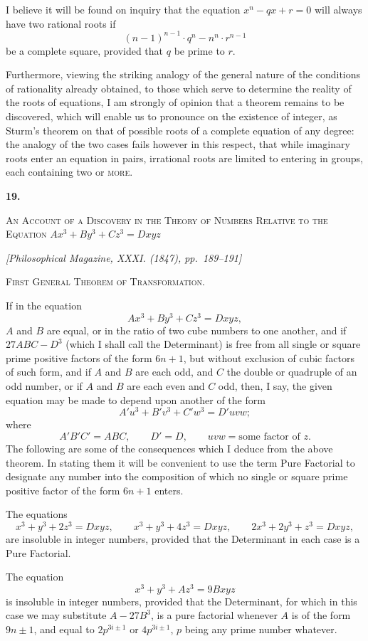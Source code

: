 \documentclass[11pt]{article}
\newcommand{\paperhead}[3]{%
  \clearpage
  \begin{center}
  {\Large\bfseries #1.}\par\vspace{0.85em}
  {\large\scshape #2}\par\vspace{0.6em}
  {\itshape [#3]}\par
  \end{center}\vspace{0.4em}}
\newcommand{\sourcepage}[1]{\marginpar{\scriptsize p.~#1}}
\begin{document}
I believe it will be found on inquiry that the equation $x^n-qx+r=0$ will always have two rational roots if
\[
(n-1)^{n-1}\cdot q^n-n^n\cdot r^{n-1}
\]
be a complete square, provided that $q$ be prime to $r$.

Furthermore, viewing the striking analogy of the general nature of the conditions of rationality already obtained, to those which serve to determine the reality of the roots of equations, I am strongly of opinion that a theorem remains to be discovered, which will enable us to pronounce on the existence of integer, as Sturm's theorem on that of possible roots of a complete equation of any degree: the analogy of the two cases fails however in this respect, that while imaginary roots enter an equation in pairs, irrational roots are limited to entering in groups, each containing two or \textsc{more}.

\paperhead{19}{An Account of a Discovery in the Theory of Numbers Relative to the Equation $Ax^3+By^3+Cz^3=Dxyz$}{Philosophical Magazine, XXXI. (1847), pp.~189--191}

\begin{center}
{\scshape First General Theorem of Transformation.}
\end{center}

\sourcepage{107}
If in the equation
\[
Ax^3+By^3+Cz^3=Dxyz, \tag{1}
\]
$A$ and $B$ are equal, or in the ratio of two cube numbers to one another, and if $27ABC-D^3$ (which I shall call the Determinant) is free from all single or square prime positive factors of the form $6n+1$, but without exclusion of cubic factors of such form, and if $A$ and $B$ are each odd, and $C$ the double or quadruple of an odd number, or if $A$ and $B$ are each even and $C$ odd, then, I say, the given equation may be made to depend upon another of the form
\[
A'u^3+B'v^3+C'w^3=D'uvw;
\]
where
\[
A'B'C'=ABC,\qquad D'=D,\qquad uvw=\text{some factor of }z.
\]
The following are some of the consequences which I deduce from the above theorem. In stating them it will be convenient to use the term Pure Factorial to designate any number into the composition of which no single or square prime positive factor of the form $6n+1$ enters.

The equations
\[
x^3+y^3+2z^3=Dxyz,
\qquad
x^3+y^3+4z^3=Dxyz,
\qquad
2x^3+2y^3+z^3=Dxyz,
\]
are insoluble in integer numbers, provided that the Determinant in each case is a Pure Factorial.

\sourcepage{108}
The equation
\[
x^3+y^3+Az^3=9Bxyz
\]
is insoluble in integer numbers, provided that the Determinant, for which in this case we may substitute $A-27B^3$, is a pure factorial whenever $A$ is of the form $9n\pm1$, and equal to $2p^{3i\pm1}$ or $4p^{3i\pm1}$, $p$ being any prime number whatever.
\end{document}
